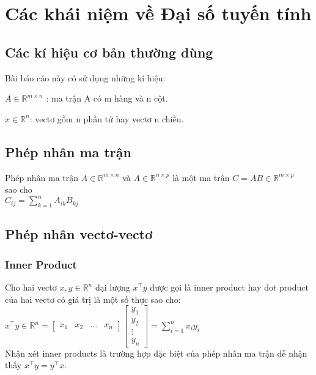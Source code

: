 \section{Các khái niệm về Đại số tuyến tính}
\subsection{Các kí hiệu cơ bản thường dùng}
Bài báo cáo này có sử dụng những kí hiệu:

$A \in \mathbb{R}^{m\times n}$	: ma trận A có m hàng và n cột.

$x \in \mathbb{R}^n$: vectơ gồm n phần tử hay vectơ n chiều.

\subsection{Phép nhân ma trận}
Phép nhân ma trận $A \in \mathbb{R}^{m\times n}$ và $A \in \mathbb{R} ^{n\times p}$ là một ma trận 
$C=AB \in \mathbb{R} ^{m\times p}$ \\sao cho \\
$C_{ij} = \sum_{k=1}^{n}A_{ik}B_{kj}$

\subsection{Phép nhân vectơ-vectơ}
\subsubsection{Inner Product}
Cho hai vectơ $x,y\in \mathbb{R}^n$ đại lượng $x^\top y$ được gọi là inner product hay dot product của hai vectơ có giá trị là một số thực sao cho:\\

$x^\top y \in \mathbb{R} ^{n} =
\left[\begin{matrix}x_1 & x_2 & \dots & x_n\end{matrix}\right]
\left[\begin{matrix}
y_1 \\
y_2 \\
\vdots\\
y_n
\end{matrix}\right]
=  \sum_{i=1}^{n}x_{i}y_{i}$\\
Nhận xét inner products là trường hợp đặc biệt của phép nhân ma trận dễ nhận thấy $x^\top y = y^\top x$.

